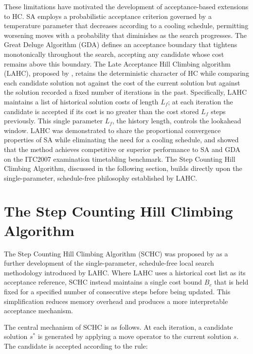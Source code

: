 \documentclass[12pt, a4paper, oneside]{report}
\begin{document}
These limitations have motivated the development of
acceptance-based extensions to HC. SA employs
a probabilistic acceptance criterion governed by a temperature
parameter that decreases according to a cooling schedule, permitting
worsening moves with a probability that diminishes as the search
progresses. The Great Deluge Algorithm (GDA) \citep{Dueck1993} defines an acceptance
boundary that tightens monotonically throughout the search, accepting
any candidate whose cost remains above this boundary. The Late
Acceptance Hill Climbing algorithm (LAHC), proposed by
\citet{Burke2017}, retains the deterministic character of HC while
comparing each candidate solution not against the cost of the current
solution but against the solution recorded a fixed number of
iterations in the past. Specifically, LAHC maintains a list of
historical solution costs of length $L_f$; at each iteration the
candidate is accepted if its cost is no greater than the cost stored
$L_f$ steps previously. This single parameter $L_f$, the history
length, controls the lookahead window. LAHC was demonstrated to share
the proportional convergence properties of SA while eliminating the
need for a cooling schedule, and \citet{Burke2017} showed that the
method achieves competitive or superior performance to SA and GDA on
the ITC2007 examination timetabling benchmark. The Step Counting Hill
Climbing Algorithm, discussed in the following section, builds
directly upon the single-parameter, schedule-free philosophy
established by LAHC.

\section{The Step Counting Hill Climbing Algorithm}
\label{sec:schc}

The Step Counting Hill Climbing Algorithm (SCHC) was proposed by
\citet{Bykov2016} as a further development of the single-parameter,
schedule-free local search methodology introduced by LAHC. Where LAHC
uses a historical cost list as its acceptance reference, SCHC instead
maintains a single cost bound $B_c$ that is held fixed for a
specified number of consecutive steps before being updated. This
simplification reduces memory overhead and produces a more
interpretable acceptance mechanism.

\newpage
The central mechanism of SCHC is as follows. At each iteration, a
candidate solution $s^*$ is generated by applying a move operator to
the current solution $s$. The candidate is accepted according to the
rule:
\end{document}
